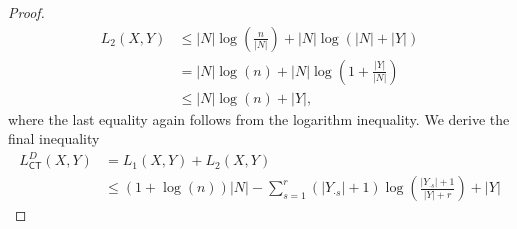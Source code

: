 \begin{proof}
\begin{align*}
    L_2(X,Y)&\leq\lvert N\rvert \log\left(\frac{n}{\lvert N\rvert }\right) +\lvert N\rvert \log(\lvert N\rvert +\lvert Y\rvert )\\ &= \lvert N\rvert \log(n) +\lvert N\rvert \log\left(1+\frac{\lvert Y\rvert }{\lvert N\rvert }\right) \\
    &\leq \lvert N\rvert \log(n) +\lvert Y\rvert ,
\end{align*}
where the last equality again follows from the logarithm inequality. We derive the final inequality 
\begin{align*}
L_{\mathsf{CT}}^D(X,Y) &= L_1(X,Y)+L_2(X,Y)\\
&\leq (1+\log(n))\lvert N\rvert -\sum_{s=1}^r(\lvert Y_{\cdot s}\rvert +1)\log\left(\frac{\lvert Y_{\cdot s}\rvert +1}{\lvert Y\rvert +r}\right)+\lvert Y\rvert 
\end{align*}
\end{proof}
